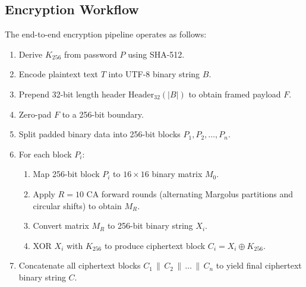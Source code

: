 \subsection{Encryption Workflow}
\label{subsec:encryption_workflow}
The end-to-end encryption pipeline operates as follows:
\begin{enumerate}
    \item Derive $K_{256}$ from password $P$ using SHA-512.
    \item Encode plaintext text $T$ into UTF-8 binary string $B$.
    \item Prepend 32-bit length header $\text{Header}_{32}(|B|)$ to obtain framed payload $F$.
    \item Zero-pad $F$ to a 256-bit boundary.
    \item Split padded binary data into 256-bit blocks $P_1, P_2, \dots, P_n$.
    \item For each block $P_i$:
    \begin{enumerate}
        \item Map 256-bit block $P_i$ to $16 \times 16$ binary matrix $M_0$.
        \item Apply $R = 10$ CA forward rounds (alternating Margolus partitions and circular shifts) to obtain $M_R$.
        \item Convert matrix $M_R$ to 256-bit binary string $X_i$.
        \item XOR $X_i$ with $K_{256}$ to produce ciphertext block $C_i = X_i \oplus K_{256}$.
    \end{enumerate}
    \item Concatenate all ciphertext blocks $C_1 \,\|\, C_2 \,\|\, \dots \,\|\, C_n$ to yield final ciphertext binary string $C$.
\end{enumerate}


